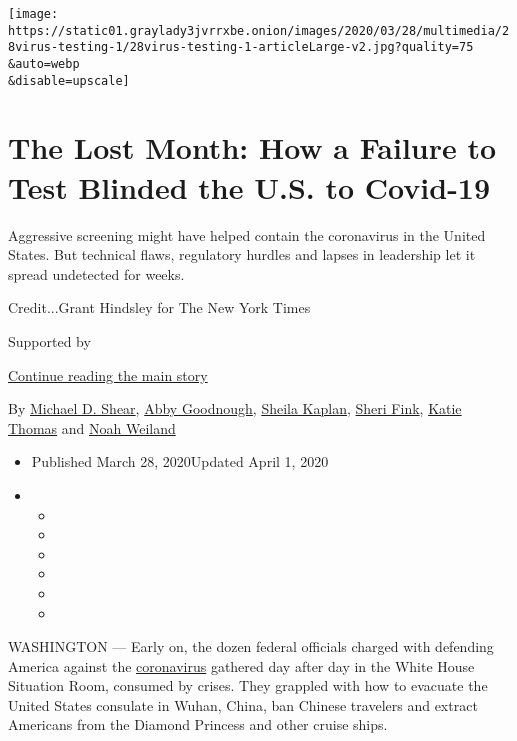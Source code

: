 \texttt{[image: https://static01.graylady3jvrrxbe.onion/images/2020/03/28/multimedia/28virus-testing-1/28virus-testing-1-articleLarge-v2.jpg?quality=75\\\&auto=webp\\\&disable=upscale]}

\hypertarget{the-lost-month-how-a-failure-to-test-blinded-the-us-to-covid-19}{%
\section{The Lost Month: How a Failure to Test Blinded the U.S. to
Covid-19}\label{the-lost-month-how-a-failure-to-test-blinded-the-us-to-covid-19}}

Aggressive screening might have helped contain the coronavirus in the
United States. But technical flaws, regulatory hurdles and lapses in
leadership let it spread undetected for weeks.

Credit...Grant Hindsley for The New York Times

Supported by

\protect\hyperlink{after-sponsor}{Continue reading the main story}

By \href{https://www.nytimes3xbfgragh.onion/by/michael-d-shear}{Michael
D. Shear},
\href{https://www.nytimes3xbfgragh.onion/by/abby-goodnough}{Abby
Goodnough},
\href{https://www.nytimes3xbfgragh.onion/by/sheila-kaplan}{Sheila
Kaplan}, \href{https://www.nytimes3xbfgragh.onion/by/sheri-fink}{Sheri
Fink}, \href{https://www.nytimes3xbfgragh.onion/by/katie-thomas}{Katie
Thomas} and
\href{https://www.nytimes3xbfgragh.onion/by/noah-weiland}{Noah Weiland}

\begin{itemize}
\item
  Published March 28, 2020Updated April 1, 2020
\item
  \begin{itemize}
  \item
  \item
  \item
  \item
  \item
  \item
  \end{itemize}
\end{itemize}

WASHINGTON --- Early on, the dozen federal officials charged with
defending America against the
\href{https://www.nytimes3xbfgragh.onion/2020/04/01/us/politics/coronavirus-trump.html}{coronavirus}
gathered day after day in the White House Situation Room, consumed by
crises. They grappled with how to evacuate the United States consulate
in Wuhan, China, ban Chinese travelers and extract Americans from the
Diamond Princess and other cruise ships.

